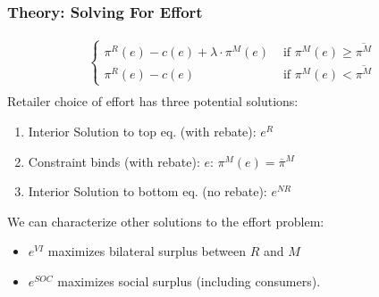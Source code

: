 \begin{frame}
\frametitle{Theory: Solving For Effort}
\begin{eqnarray*}
\label{effortchoice}
\begin{cases}
 \pi^R(e) -c(e) + \lambda \cdot \pi^M(e) &\mbox{ if } \pi^M(e) \geq \overline{\pi^M}\\
 \pi^R(e)  -c(e)   &\mbox{ if } \pi^M(e) < \overline{\pi^M}
\end{cases}\\
\end{eqnarray*}
Retailer choice of effort has three potential solutions:
\begin{enumerate}
\item Interior Solution to top eq. (with rebate): $e^{R}$
\item Constraint binds (with rebate):  $e$: $\pi^M(e) = \overline{\pi}^M$
\item Interior Solution to bottom eq. (no rebate): $e^{NR}$
\end{enumerate}
We can characterize other solutions to the effort problem:
\begin{itemize}
\item $e^{VI}$ maximizes bilateral surplus between $R$ and $M$
\item $e^{SOC}$ maximizes social surplus (including consumers).
\end{itemize}
\end{frame}




